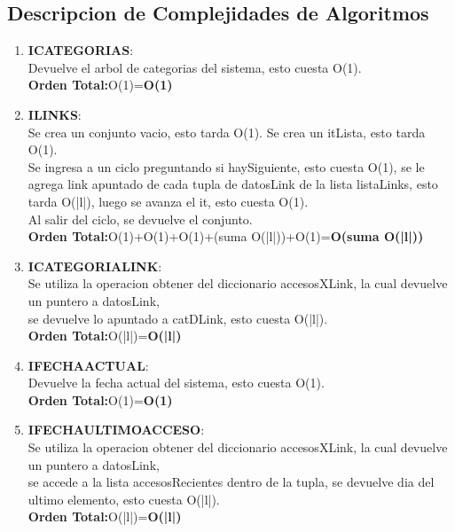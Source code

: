 \documentclass[10pt, a4paper]{article}
\begin{document}
\subsection{\huge Descripcion de Complejidades de Algoritmos}	
  
    \begin{enumerate}
     \item \textbf{ICATEGORIAS}: \\ Devuelve el arbol de categorias del sistema, esto cuesta O(1). \\
      \textbf{Orden Total:}O(1)=\textbf{O(1)}

     \item \textbf{ILINKS}:\\ Se crea un conjunto vacio, esto tarda O(1). Se crea un itLista, esto tarda O(1). \\ Se ingresa a un ciclo preguntando si haySiguiente, esto cuesta O(1), se le agrega link apuntado de cada tupla de datosLink de la lista listaLinks, esto tarda O(|l|), luego se avanza el it, esto cuesta O(1).\\ Al salir del ciclo, se devuelve el conjunto. \\
	\textbf{Orden Total:}O(1)+O(1)+O(1)+(suma O(|l|))+O(1)=\textbf{O(suma O(|l|))}

     \item \textbf{ICATEGORIALINK}:\\ Se utiliza la operacion obtener del diccionario accesosXLink, la cual devuelve un puntero a datosLink,\\ se devuelve lo apuntado a catDLink, esto cuesta O(|l|). \\
	  \textbf{Orden Total:}O(|l|)=\textbf{O(|l|)}

      \item \textbf{IFECHAACTUAL}:\\ Devuelve la fecha actual del sistema, esto cuesta O(1). \\
	  \textbf{Orden Total:}O(1)=\textbf{O(1)}

     \item \textbf{IFECHAULTIMOACCESO}:\\ Se utiliza la operacion obtener del diccionario accesosXLink, la cual devuelve un puntero a datosLink,\\ se accede a la lista accesosRecientes dentro de la tupla, se devuelve dia del ultimo elemento, esto cuesta O(|l|). \\
	  \textbf{Orden Total:}O(|l|)=\textbf{O(|l|)}


\end{enumerate}
\end{document}
